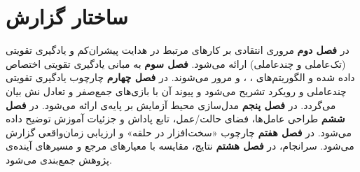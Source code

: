 \section{ساختار گزارش}\label{sec:chapter_content}
در \textbf{فصل دوم} مروری انتقادی بر کارهای مرتبط در هدایت پیشران‌کم و یادگیری تقویتی (تک‌عاملی و چندعاملی) ارائه می‌شود. \textbf{فصل سوم} به مبانی یادگیری تقویتی اختصاص داده شده و الگوریتم‌های ، ،  و  مرور می‌شوند. در \textbf{فصل چهارم} چارچوب یادگیری تقویتی چندعاملی و رویکرد  تشریح می‌شود و پیوند آن با بازی‌های جمع‌صفر و تعادل نش بیان می‌گردد. در \textbf{فصل پنجم} مدل‌سازی محیط آزمایش بر پایه‌ی  ارائه می‌شود. در \textbf{فصل ششم} طراحی عامل‌ها، فضای حالت/عمل، تابع پاداش و جزئیات آموزش توضیح داده می‌شود. در \textbf{فصل هفتم} چارچوب «سخت‌افزار در حلقه» و ارزیابی زمان‌واقعی گزارش می‌شود. سرانجام، در \textbf{فصل هشتم} نتایج، مقایسه با معیارهای مرجع و مسیرهای آینده‌ی پژوهش جمع‌بندی می‌شود.
